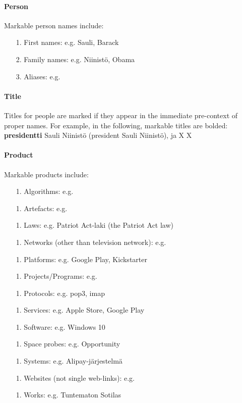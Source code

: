 \documentclass[11pt]{article}
\begin{document}
\paragraph{Person}

Markable person names include:

\begin{itemize}

\item[1.] First names: e.g. Sauli, Barack
\item[2.] Family names: e.g. Niinist\"o, Obama
\item[3.] Aliases: e.g. 

\end{itemize}


\paragraph{Title}

Titles for people are marked if they appear in the immediate pre-context of proper names. For example, in the following, markable titles are bolded: \textbf{presidentti} Sauli Niinist\"o (president Sauli Niinist\"o), \textbf{} ja \textbf{} X X   


\paragraph{Product}

Markable products include:

\begin{itemize}

\item[1.] Algorithms: e.g.
\item[1.] Artefacts: e.g.
\item[1.] Laws: e.g. Patriot Act-laki (the Patriot Act law)
\item[1.] Networks (other than television network): e.g.
\item[1.] Platforms: e.g. Google Play, Kickstarter
\item[1.] Projects/Programs: e.g.
\item[1.] Protocols: e.g. pop3, imap
\item[1.] Services: e.g. Apple Store, Google Play
\item[1.] Software: e.g. Windows 10
\item[1.] Space probes: e.g. Opportunity
\item[1.] Systems: e.g. Alipay-j\"arjestelm\"a
\item[1.] Websites (not single web-links): e.g.
\item[1.] Works: e.g. Tuntematon Sotilas 

\end{itemize}
\end{document}
